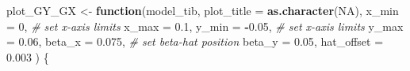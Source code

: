 \documentclass[
]{article}
\newenvironment{Shaded}{\begin{snugshade}}{\end{snugshade}}
\newcommand{\AttributeTok}[1]{\textcolor[rgb]{0.13,0.29,0.53}{#1}}
\newcommand{\CommentTok}[1]{\textcolor[rgb]{0.56,0.35,0.01}{\textit{#1}}}
\newcommand{\ConstantTok}[1]{\textcolor[rgb]{0.56,0.35,0.01}{#1}}
\newcommand{\ControlFlowTok}[1]{\textcolor[rgb]{0.13,0.29,0.53}{\textbf{#1}}}
\newcommand{\DecValTok}[1]{\textcolor[rgb]{0.00,0.00,0.81}{#1}}
\newcommand{\FloatTok}[1]{\textcolor[rgb]{0.00,0.00,0.81}{#1}}
\newcommand{\FunctionTok}[1]{\textcolor[rgb]{0.13,0.29,0.53}{\textbf{#1}}}
\newcommand{\NormalTok}[1]{#1}
\newcommand{\OtherTok}[1]{\textcolor[rgb]{0.56,0.35,0.01}{#1}}
\newcommand{\SpecialCharTok}[1]{\textcolor[rgb]{0.81,0.36,0.00}{\textbf{#1}}}
\begin{document}
\begin{Shaded}
\begin{Highlighting}[]
\NormalTok{plot\_GY\_GX }\OtherTok{\textless{}{-}} \ControlFlowTok{function}\NormalTok{(model\_tib, }
                       \AttributeTok{plot\_title =} \FunctionTok{as.character}\NormalTok{(}\ConstantTok{NA}\NormalTok{),}
                       \AttributeTok{x\_min =} \DecValTok{0}\NormalTok{,                     }\CommentTok{\# set x{-}axis limits}
                       \AttributeTok{x\_max =} \FloatTok{0.1}\NormalTok{,}
                       \AttributeTok{y\_min =} \SpecialCharTok{{-}}\FloatTok{0.05}\NormalTok{,                 }\CommentTok{\# set x{-}axis limits}
                       \AttributeTok{y\_max =} \FloatTok{0.06}\NormalTok{,}
                       \AttributeTok{beta\_x =} \FloatTok{0.075}\NormalTok{,                }\CommentTok{\# set beta{-}hat position}
                       \AttributeTok{beta\_y =} \FloatTok{0.05}\NormalTok{,}
                       \AttributeTok{hat\_offset =} \FloatTok{0.003}
\NormalTok{)}
\NormalTok{\{}
  

\end{Highlighting}
\end{Shaded}
\end{document}
